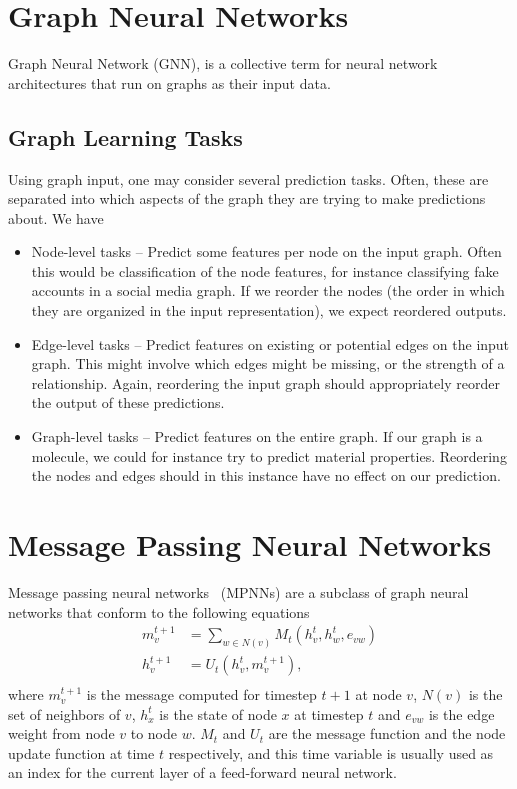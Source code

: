 \documentclass[../main.tex]{subfiles}
\begin{document}
    \section{Graph Neural Networks}\label{sec:graph-neural-networks}
    Graph Neural Network (GNN), is a collective term for neural network architectures that run on graphs as their input data.

    \subsection{Graph Learning Tasks}\label{subsec:graph-learning-tasks}
    Using graph input, one may consider several prediction tasks.
    Often, these are separated into which aspects of the graph they are trying to make predictions about.
    We have
    \begin{itemize}
        \item Node-level tasks -- Predict some features per node on the input graph.
        Often this would be classification of the node features, for instance classifying fake accounts in a social media graph.
        If we reorder the nodes (the order in which they are organized in the input representation), we expect reordered outputs.
        \item Edge-level tasks -- Predict features on existing or potential edges on the input graph.
        This might involve which edges might be missing, or the strength of a relationship.
        Again, reordering the input graph should appropriately reorder the output of these predictions.
        \item Graph-level tasks -- Predict features on the entire graph.
        If our graph is a molecule, we could for instance try to predict material properties.
        Reordering the nodes and edges should in this instance have no effect on our prediction.
    \end{itemize}

    \section{Message Passing Neural Networks}\label{sec:message-passing-neural-networks}
    Message passing neural networks~\cite{gilmerNeuralMessagePassing2017} (MPNNs) are a subclass of graph neural networks that conform to the following equations
    \begin{align}
        m^{t+1}_v &= \sum_{w \in N(v)} M_t(h^t_v, h^t_w, e_{vw})\label{eq:mpnn-message}\\
        h^{t+1}_v &= U_t(h_v^t, m_v^{t + 1}),\label{eq:mpnn-update}\\
    \end{align}
    where $m^{t+1}_v$ is the message computed for timestep $t + 1$ at node $v$, $N(v)$ is the set of neighbors of $v$, $h^t_x$ is the state of node $x$ at timestep $t$ and $e_{vw}$ is the edge weight from node $v$ to node $w$.
    $M_t$ and $U_t$ are the message function and the node update function at time $t$ respectively, and this time variable is usually used as an index for the current layer of a feed-forward neural network.
\end{document}
